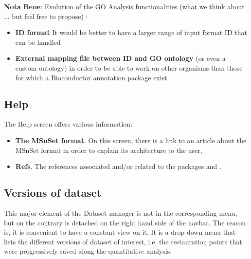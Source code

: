 \documentclass[12pt]{article}
\begin{document}
{\textbf{Nota Bene}: Evolution of the GO Analysis functionalities (what we think 
about ... but feel free to propose) :
\begin{itemize}
\item \textbf{ID format} It would be better to have a larger range of input 
format ID that can be handled
\item \textbf{External mapping file between ID and GO ontology} (or even a 
custom ontology) in order to be able to work on other organisms than those for 
which a Bioconductor annotation package exist. 
\end{itemize}


\subsection{Help}
The Help screen offers various information:
\begin{itemize}
\item\textbf{{The MSnSet format}}. On this screen, there is a link to an 
article about the MSnSet format in order to explain its architecture to the 
user,
\item\textbf{{Refs}}. The references associated and/or related to the 
packages  and .
\end{itemize}


\subsection{Versions of dataset}\label{sec:availabledatasets}
This major element of the Dataset manager is not in the corresponding menu, 
but on the contrary is detached on the right hand side of the navbar. The 
reason is,  it is convenient to have a constant view on it. It is a drop-down 
menu that lists the different versions of dataset of interest, i.e. the 
restauration points that were progressively saved along the quantitative 
analysis. 

}
\end{document}
